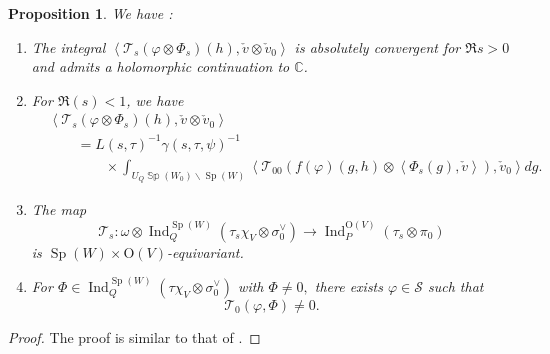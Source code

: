 \documentclass[article]{article}
\numberwithin{equation}{section}
\newtheorem{proposition}[theorem]{Proposition}
\theoremstyle{definition}
\DeclareMathOperator{\SP}{Sp}
\begin{document}
\begin{proposition}\label{intertwingmap}
	We have :
	\begin{enumerate}
		\item The integral $\left\langle\mathcal{T}_{s}\left(\varphi\otimes \Phi_{s}\right)\left(h\right), \check{v} \otimes \check{v}_{0}\right\rangle$ is absolutely convergent for $\Re s>0$ and admits a holomorphic continuation to $\mathbb C$. 
	    \item For $\Re(s)<1$, we have 
	    \begin{align*}
	    &\left\langle\mathcal{T}_{s}\left(\varphi\otimes \Phi_{s}\right)\left(h\right), \check{v} \otimes \check{v}_{0}\right\rangle\\
	    &\qquad=L(s, \tau)^{-1} \gamma(s, \tau, \psi)^{-1}\\
	    &\qquad\qquad \times\int_{U_{Q} \mathbb{\SP}(W_0) \backslash \SP\left(W\right)}\left\langle\mathcal{T}_{00}\left(f(\varphi )\left(g ,h\right)\otimes\left\langle\Phi_{s}\left(g\right), \check{v}\right\rangle\right), \check{v}_{0}\right\rangle d g.
	    \end{align*}
	    \item  The map 
	    $$\mathcal{T}_{s} : \omega\otimes \operatorname{Ind}_{Q}^{\SP\left(W\right)}\left(\tau_{s}\chi_{V} \otimes \sigma_{0}^{\vee}\right) \rightarrow \operatorname{Ind}_{P}^{\mathrm{O}\left(V\right)}\left(\tau_{s}  \otimes \pi_0\right)$$
	    is $\SP(W)\times \mathrm O(V)$-equivariant. 
	    \item For $\Phi \in \operatorname{Ind}_{Q}^{\mathrm{\SP}\left(W\right)}\left(\tau\chi_{V} \otimes \sigma_{0}^{\vee}\right)$ with $\Phi \neq 0,$ there exists $\varphi \in \mathscr S$ such that
	    $$\mathcal{T}_{0}(\varphi, \Phi) \neq 0.$$
	\end{enumerate}
\end{proposition}
\begin{proof}
	The proof is similar to that of \cite[Proposition 7.2]{MR3788848}. 
\end{proof}
\end{document}
